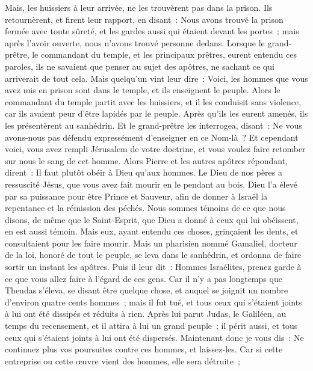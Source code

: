 \begin{multicols}{2}
Mais, les huissiers à leur arrivée, ne les trouvèrent pas dans la prison. Ils retournèrent, et firent leur rapport,
en disant~: Nous avons trouvé la prison fermée avec toute sûreté, et les gardes aussi qui étaient devant les portes~; mais après l'avoir ouverte, nous n'avons trouvé personne dedans.
Lorsque le grand-prêtre, le commandant du temple, et les principaux prêtres, eurent entendu ces paroles, ils ne savaient que penser au sujet des apôtres, ne sachant ce qui arriverait de tout cela.
Mais quelqu'un vint leur dire~: Voici, les hommes que vous avez mis en prison sont dans le temple, et ils enseignent le peuple.
Alors le commandant du temple partit avec les huissiers, et il les conduisit sans violence, car ils avaient peur d'être lapidés par le peuple.
Après qu'ils les eurent amenés, ils les présentèrent au sanhédrin. Et le grand-prêtre les interrogea, disant~: 
Ne vous avons-nous pas défendu expressément d'enseigner en ce Nom-là~? Et cependant voici, vous avez rempli Jérusalem de votre doctrine, et vous voulez faire retomber sur nous le sang de cet homme.
Alors Pierre et les autres apôtres répondant, dirent~: Il faut plutôt obéir à Dieu qu'aux hommes.
Le Dieu de nos pères a ressuscité Jésus, que vous avez fait mourir en le pendant au bois.
Dieu l'a élevé par sa puissance pour être Prince et Sauveur, afin de donner à Israël la repentance et la rémission des péchés.
Nous sommes témoins de ce que nous disons, de même que le Saint-Esprit, que Dieu a donné à ceux qui lui obéissent, en est aussi témoin.
Mais eux, ayant entendu ces choses, grinçaient les dents, et consultaient pour les faire mourir.
Mais un pharisien nommé Gamaliel, docteur de la loi, honoré de tout le peuple, se leva dans le sanhédrin, et ordonna de faire sortir un instant les apôtres.
Puis il leur dit~: Hommes Israélites, prenez garde à ce que vous allez faire à l'égard de ces gens.
Car il n'y a pas longtemps que Theudas s'éleva, se disant être quelque chose, et auquel se joignit un nombre d'environ quatre cents hommes~; mais il fut tué, et tous ceux qui s'étaient joints à lui ont été dissipés et réduits à rien.
Après lui parut Judas, le Galiléen, au temps du recensement, et il attira à lui un grand peuple~; il périt aussi, et tous ceux qui s'étaient joints à lui ont été dispersés.
Maintenant donc je vous dis~: Ne continuez plus vos poursuites contre ces hommes, et laissez-les. Car si cette entreprise ou cette œuvre vient des hommes, elle sera détruite~;

\end{multicols}
